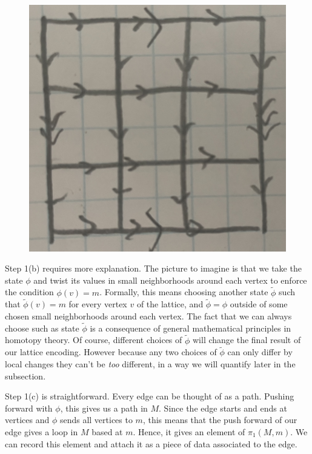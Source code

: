 \documentclass{article}
\theoremstyle{definition}
\newcommand{\0}{\left|0\right>}
\newcommand{\1}{\left|1\right>}
\numberwithin{figure}{section}
\begin{document}
\begin{figure}[h]
\begin{center}
\includegraphics[scale=.04]{torus-lattice}
\end{center}
\end{figure}

Step 1(b) requires more explanation. The picture to imagine is that we take the state $\phi$ and twist its values in small neighborhoods around each vertex to enforce the condition $\phi(v)=m$. Formally, this means choosing another state $\tilde{\phi}$ such that $\tilde{\phi}(v)=m$ for every vertex $v$ of the lattice, and $\tilde{\phi}=\phi$ outside of some chosen small neighborhoods around each vertex. The fact that we can always choose such as state $\tilde{\phi}$ is a consequence of general mathematical principles in homotopy theory. Of course, different choices of $\tilde{\phi}$ will change the final result of our lattice encoding. However because any two choices of $\tilde{\phi}$ can only differ by local changes they can't be \textit{too} different, in a way we will quantify later in the subsection.

Step 1(c) is straightforward. Every edge can be thought of as a path. Pushing forward with $\phi$, this gives us a path in $M$. Since the edge starts and ends at vertices and $\phi$ sends all vertices to $m$, this means that the push forward of our edge gives a loop in $M$ based at $m$. Hence, it gives an element of $\pi_1(M,m)$. We can record this element and attach it as a piece of data associated to the edge.
\end{document}

